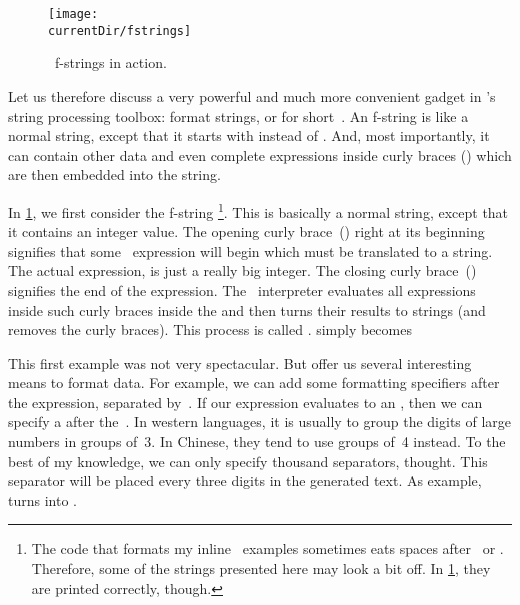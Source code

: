 \begin{figure}%
\centering%
\texttt{[image: \\currentDir/fstrings]}%
\caption{\python\ f-strings in action.}%
\label{fig:fstrings}%
\end{figure}

Let us therefore discuss a very powerful and much more convenient gadget in \python's string processing toolbox: format strings, or  for short~\cite{PSF2024FSL,PEP498,M2017WAFSIPAHCIUT,B2023PFS}.
An f-string is like a normal string, except that it starts with  instead of .
And, most importantly, it can contain other data and even complete expressions inside curly braces (\pythonIdx{\textbraceleft}\pythonIdx{\textbraceright}) which are then embedded into the string.%
%
\begin{sloppypar}%
In \cref{fig:fstrings}, we first consider the f-string \footnote{
The code that formats my inline \python\ examples sometimes eats spaces after \textbraceleft\ or \textbraceright. %
Therefore, some of the strings presented here may look a bit off. %
In \cref{fig:fstrings}, they are printed correctly, though.}.
This is basically a normal string, except that it contains an integer value.
The opening curly brace~(\inQuotes{\textbraceleft}) right at its beginning signifies that some \python\ expression will begin which must be translated to a string.
The actual expression,  is just a really big integer.
The closing curly brace~(\inQuotes{\textbraceright}) signifies the end of the expression.
The \python\ interpreter evaluates all expressions inside such curly braces inside the  and then turns their results to strings (and removes the curly braces).
This process is called \emph{}.
 simply becomes %
\end{sloppypar}%
%
\begin{sloppypar}%
This first example was not very spectacular.
But  offer us several interesting means to format data.
For example, we can add some formatting specifiers after the expression, separated by~\pythonilIdx{:}.
If our expression evaluates to an , then we can specify a  after the~\pythonilIdx{:}.
In western languages, it is usually to group the digits of large numbers in groups of~3.
In Chinese, they tend to use groups of~4 instead.
To the best of my knowledge, we can only specify thousand separators, thought.
This separator will be placed every three digits in the generated text.
As example,  turns into .%
\end{sloppypar}%
